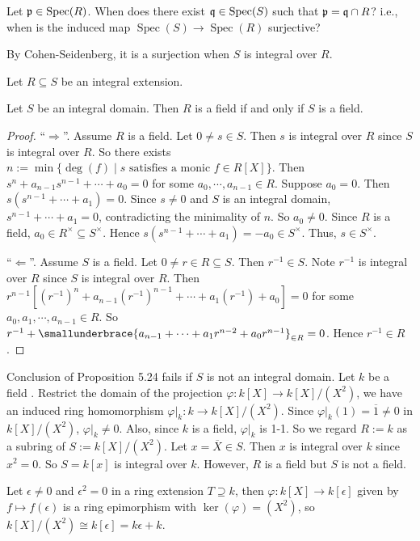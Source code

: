 \begin{discussion}
    Let $\mathfrak{p} \in \operatorname{Spec}(R)$. When does there exist $\mathfrak{q} \in \operatorname{Spec}(S)$ such that $\mathfrak{p} = \mathfrak{q} \cap R$? i.e., when is the induced map $\operatorname{Spec}(S) \to \operatorname{Spec}(R)$ surjective? \par 
    By Cohen-Seidenberg, it is a surjection when $S$ is integral over $R$.
\end{discussion}

\noindent Let $R \subseteq S$ be an integral extension.

\begin{proposition}
    Let $S$ be an integral domain. Then $R$ is a field if and only if $S$ is a field.
\end{proposition}

\begin{proof}
    ``$\Rightarrow$''. Assume $R$ is a field. Let $0 \neq s \in S$. Then $s$ is integral over $R$ since $S$ is integral over $R$. So there exists $n := \min\{\deg(f) \mid s \text{ satisfies a monic }f \in R[X]\}$. Then $s^{n} + a_{n-1}s^{n-1} + \cdots + a_0 = 0$ for some $a_0,\cdots,a_{n-1} \in R$. Suppose $a_0 = 0$. Then $s(s^{n-1} + \cdots + a_1) = 0$. Since $s \neq 0$ and $S$ is an integral domain, $s^{n-1} + \cdots +a_1 = 0$, contradicting the minimality of $n$. So $a_0 \neq 0$. Since $R$ is a field, $a_0 \in R^{\times} \subseteq S^{\times}$. Hence $s(s^{n-1} + \cdots + a_1) = -a_0 \in S^{\times}$. Thus, $s \in S^{\times}$. \par 
    ``$\Leftarrow$''. Assume $S$ is a field. Let $0 \neq r \in R \subseteq S$. Then $r^{-1} \in S$. Note $r^{-1}$ is integral over $R$ since $S$ is integral over $R$. Then $r^{n-1}[(r^{-1})^{n} + a_{n-1}(r^{-1})^{n-1} + \cdots + a_1(r^{-1}) + a_0] = 0$ for some $a_0,a_1,\cdots,a_{n-1} \in R$. So $r^{-1} + \smallunderbrace{a_{n-1} + \cdots + a_1r^{n-2} + a_0r^{n-1}}_{\in R} = 0$. Hence $r^{-1} \in R$.
\end{proof}

\begin{example*}
    Conclusion of Proposition 5.24 fails if $S$ is not an integral domain. Let $k$ be a field . Restrict the domain of the projection $\varphi: k[X] \to k[X]/(X^{2})$, we have an induced ring homomorphism $\varphi|_k: k \to k[X]/(X^{2})$. Since $\varphi|_k(1) = \overbar{1} \neq 0$ in $k[X]/(X^{2})$, $\varphi|_k \neq 0$. Also, since $k$ is a field, $\varphi|_k$ is 1-1. So we regard $R := k$ as a subring of $S := k[X]/(X^{2})$. Let $x = \overbar{X} \in S$. Then $x$ is integral over $k$ since $x^{2} = 0$. So $S = k[x]$ is integral over $k$. However, $R$ is a field but $S$ is not a field.  \par
    Let $\epsilon \neq 0$ and $\epsilon^{2} = 0$ in a ring extension $T \supseteq k$, then $\varphi: k[X] \to k[\epsilon]$ given by $f \mapsto f(\epsilon)$ is a ring epimorphism with $\ker(\varphi) = (X^{2})$, so $k[X]/(X^{2}) \cong k[\epsilon] = k\epsilon + k$.
\end{example*}

